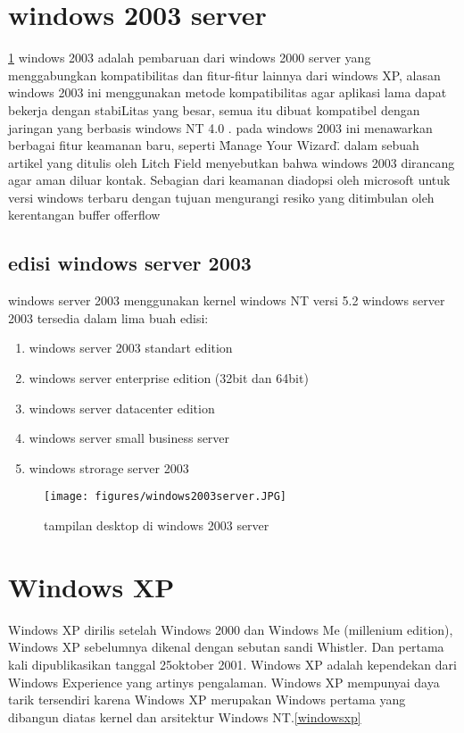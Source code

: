 \section{windows 2003 server}
\ref{windows2003server}
	windows 2003 adalah pembaruan dari windows 2000 server yang menggabungkan kompatibilitas dan fitur-fitur lainnya dari windows XP, alasan windows 2003 ini menggunakan metode kompatibilitas agar aplikasi lama dapat bekerja dengan stabiLitas yang besar, semua itu dibuat kompatibel dengan jaringan yang berbasis windows NT 4.0 . pada windows 2003 ini menawarkan berbagai fitur keamanan baru, seperti \"Manage Your Wizard\".
	dalam sebuah artikel yang ditulis oleh Litch Field menyebutkan bahwa windows 2003 dirancang agar aman diluar kontak. Sebagian dari keamanan diadopsi oleh microsoft untuk versi windows terbaru dengan tujuan mengurangi resiko yang ditimbulan oleh kerentangan buffer offerflow \cite{litchfield2003defeating}
	\subsection{edisi windows server 2003}
		windows server 2003 menggunakan kernel windows NT versi 5.2 
		windows server 2003 tersedia dalam lima buah edisi:
\begin{enumerate}
		\item windows server 2003 standart edition
 		\item windows server enterprise edition (32bit dan 64bit)
		\item windows server datacenter edition
		\item windows server small business server
		\item windows strorage server 2003
\end{enumerate}

\begin{figure}[ht]
\centerline{\texttt{[image: figures/windows2003server.JPG]}}
\caption{tampilan desktop di windows 2003 server}
\label{windows2003server}
\end{figure}
	\section{Windows XP}
		Windows XP dirilis setelah Windows 2000 dan Windows Me (millenium edition), Windows XP sebelumnya dikenal dengan sebutan sandi Whistler. Dan pertama kali dipublikasikan tanggal 25oktober 2001. Windows XP adalah kependekan dari Windows Experience yang artinys pengalaman. Windows XP mempunyai daya tarik tersendiri karena Windows XP merupakan Windows pertama yang dibangun diatas kernel dan arsitektur Windows NT.\cite{pogue2002windows}\ref{windowsxp}
